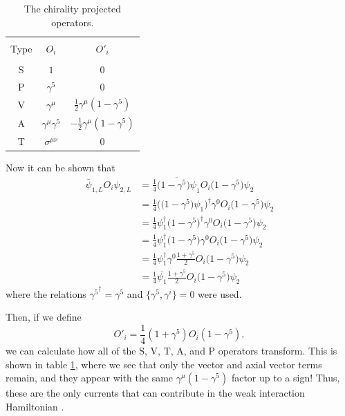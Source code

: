 \begin{table}[h]
  \caption{The chirality projected operators.} 
  \centering
  \begin{tabular}{c c c }
    \hline \hline \\ [-1.75ex]
    Type & $O_i$ & $O'_i$ \\ [0.50ex]
    \hline \\ 
    S & $1$ & 0 \\ [0.50ex]
    P & $\gamma^5$ & 0 \\ [0.50ex]
    V & $\gamma^{\mu}$ & $\frac{1}{2}\gamma^\mu(1-\gamma^5)$ \\ [0.50ex]
    A & $\gamma^{\mu}\gamma^5$ & $-\frac{1}{2}\gamma^\mu(1-\gamma^5)$ \\ [0.50ex]
    T & $\sigma^{\mu\nu}$ & 0 \\ [0.50ex]   
    \hline
  \end{tabular}
  \label{tab:operatorPrime}
\end{table}

Now it can be shown that
%
\begin{align*}
  \bar{\psi}_{1,L} O_i \psi_{2,L} &= \frac{1}{4}\overline{\big(1-\gamma^5\big)\psi}_{1} O_i \big(1-\gamma^5\big)\psi_{2} \\
  &= \frac{1}{4}\Big(\big(1-\gamma^5\big)\psi_{1}\Big)^\dagger \gamma^0 O_i \big(1-\gamma^5\big)\psi_{2} \\
  &= \frac{1}{4}\psi^\dagger_{1}\big(1-\gamma^5\big)^\dagger \gamma^0 O_i \big(1-\gamma^5\big)\psi_{2} \\
  &= \frac{1}{4}\psi^\dagger_{1}\big(1-\gamma^5\big) \gamma^0 O_i \big(1-\gamma^5\big)\psi_{2} \\
  &= \frac{1}{4}\psi^\dagger_{1}\gamma^0\frac{1+\gamma^5}{2} O_i \big(1-\gamma^5\big)\psi_{2} \\
  &= \frac{1}{4}\bar{\psi_{1}}\frac{1+\gamma^5}{2} O_i \big(1-\gamma^5\big)\psi_{2} 
\end{align*}
%
where the relations ${\gamma^5}^\dagger = \gamma^5$ and $\{\gamma^5,\gamma^i\}=0$ were used.

Then, if we define
\begin{equation*}
  O'_i = \frac{1}{4}(1+\gamma^5) O_i (1-\gamma^5),
\end{equation*}
we can calculate how all of the S, V, T, A, and P operators transform. This is shown in table
\ref{tab:operatorPrime}, where we see that only the vector and axial vector terms remain, and they
appear with the same $\gamma^\mu(1-\gamma^5)$ factor up to a sign! Thus, these are the only
currents that can contribute in the weak interaction Hamiltonian \cite{greiner1996}.



